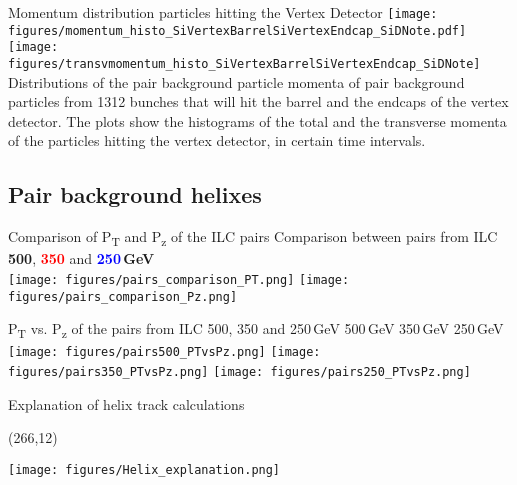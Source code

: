 \documentclass[xcolor={dvipsnames}]{beamer}
\newcommand{\proceedigHelix}{
  \setlength{\TPHorizModule}{1pt}
  \setlength{\TPVertModule}{1pt}
  \begin{textblock}{55}(266,12)
  \centering
  \textblockcolour{SpringGreen}
  \vspace*{0.8mm}{arXiv:\\1703.05737}\vspace*{0.8mm}
  \end{textblock}
}
\begin{document}
\begin{frame}{Momentum distribution particles hitting the Vertex Detector}
  \texttt{[image: figures/momentum\_histo\_SiVertexBarrelSiVertexEndcap\_SiDNote.pdf]}
  \texttt{[image: figures/transvmomentum\_histo\_SiVertexBarrelSiVertexEndcap\_SiDNote]}\\
  Distributions of the pair background particle momenta of pair background particles from 1312 bunches that will hit the barrel and the endcaps of the vertex detector.
  The plots show the histograms of the total and the transverse momenta of the particles hitting the vertex detector, in certain time intervals.
\end{frame}

\subsection{Pair background helixes}
\begin{frame}{Comparison of P\textsubscript{T} and P\textsubscript{z} of the ILC pairs}
Comparison between pairs from ILC \textbf{500}, \textbf{\textcolor{Red}{350}} and \textbf{\textcolor{Blue}{250}\,GeV}\\
\vspace*{0.5cm}
  \texttt{[image: figures/pairs\_comparison\_PT.png]}
  \texttt{[image: figures/pairs\_comparison\_Pz.png]}
\end{frame}

\begin{frame}{P\textsubscript{T} vs. P\textsubscript{z} of the pairs from ILC 500, 350 and 250\,GeV}
\hspace*{1.4cm}500\,GeV \hspace*{2.5cm} 350\,GeV \hspace*{2.5cm} 250\,GeV\\
\vspace*{0.5cm}
  \texttt{[image: figures/pairs500\_PTvsPz.png]}
  \texttt{[image: figures/pairs350\_PTvsPz.png]}
  \texttt{[image: figures/pairs250\_PTvsPz.png]}
\end{frame}


\begin{frame}{Explanation of helix track calculations}
\proceedigHelix
 \begin{center}
  \texttt{[image: figures/Helix\_explanation.png]}
\end{center}
\end{frame}
\end{document}
